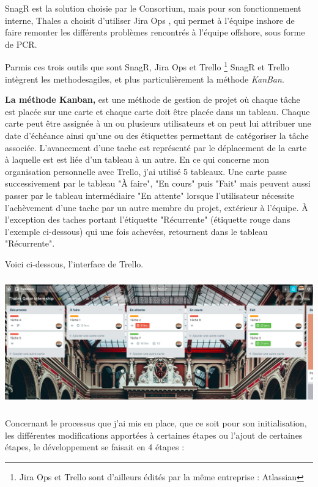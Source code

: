 \gls{SnagR} est la solution choisie par le Consortium, mais pour son fonctionnement interne, Thales a choisit d'utiliser Jira Ops , qui permet à l'équipe inshore de faire remonter les différents problèmes rencontrés à l'équipe offshore, sous forme de \gls{PCR}.

Parmis ces trois outils que sont SnagR, Jira Ops et Trello \footnote{Jira Ops et Trello sont d'ailleurs édités par la même entreprise : Atlassian} SnagR et Trello intègrent les \gls{methodesagiles}, et plus particulièrement la méthode \textit{KanBan}.

\textbf{La méthode Kanban,} est une méthode de gestion de projet où chaque tâche est placée sur une carte et chaque carte doit être placée dans un tableau. Chaque carte peut être assignée à un ou plusieurs utilisateurs et on peut lui attribuer une date d'échéance ainsi qu'une ou des étiquettes permettant de catégoriser la tâche associée. L'avancement d'une tache est représenté par le déplacement de la carte à laquelle est est liée d'un tableau à un autre. 
En ce qui concerne mon organisation personnelle avec Trello, j'ai utilisé 5 tableaux. Une carte passe successivement par le tableau "À faire", "En cours" puis "Fait" mais peuvent aussi passer par le tableau intermédiaire "En attente" lorsque l'utilisateur nécessite l'achèvement d'une tache par un autre membre du projet, extérieur à l'équipe. À l'exception des taches portant l'étiquette "Récurrente" (étiquette rouge dans l'exemple ci-dessous) qui une fois achevées, retournent dans le tableau "Récurrente".

Voici ci-dessous, l'interface de Trello.

\begin{center}
\includegraphics[height=5.5cm]{ressources/images/figures/Trello.png}
\end{center}

\newpage

Concernant le processus que j'ai mis en place, que ce soit pour son initialisation, les différentes modifications apportées à certaines étapes ou l'ajout de certaines étapes, le développement se faisait en 4 étapes :


